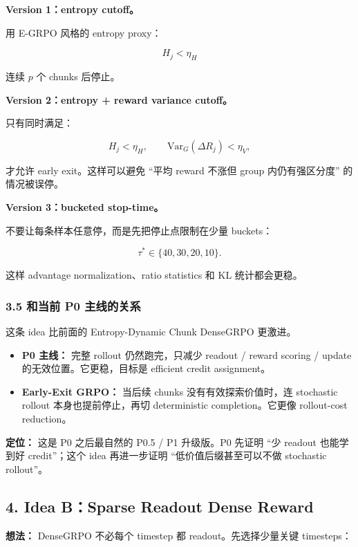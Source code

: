 \textbf{Version 1：entropy cutoff。}

用 E-GRPO 风格的 entropy proxy：

\[
H_j<\eta_H
\]

连续 \(p\) 个 chunks 后停止。

\textbf{Version 2：entropy + reward variance cutoff。}

只有同时满足：

\[
H_j<\eta_H,
\qquad
\mathrm{Var}_{G}(\Delta R_j)<\eta_V,
\]

才允许 early exit。这样可以避免 ``平均 reward 不涨但 group 内仍有强区分度'' 的情况被误停。

\textbf{Version 3：bucketed stop-time。}

不要让每条样本任意停，而是先把停止点限制在少量 buckets：

\[
\tau^*\in\{40,30,20,10\}.
\]

这样 advantage normalization、ratio statistics 和 KL 统计都会更稳。

\subsubsection{3.5 和当前 P0 主线的关系}

这条 idea 比前面的 Entropy-Dynamic Chunk DenseGRPO 更激进。

\begin{itemize}[leftmargin=1.5em]
  \item \textbf{P0 主线：} 完整 rollout 仍然跑完，只减少 readout / reward scoring / update 的无效位置。它更稳，目标是 efficient credit assignment。
  \item \textbf{Early-Exit GRPO：} 当后续 chunks 没有有效探索价值时，连 stochastic rollout 本身也提前停止，再切 deterministic completion。它更像 rollout-cost reduction。
\end{itemize}

\begin{summarybox}
\textbf{定位：} 这是 P0 之后最自然的 P0.5 / P1 升级版。P0 先证明 ``少 readout 也能学到好 credit''；这个 idea 再进一步证明 ``低价值后缀甚至可以不做 stochastic rollout''。
\end{summarybox}

\subsection{4. Idea B：Sparse Readout Dense Reward}

\textbf{想法：} DenseGRPO 不必每个 timestep 都 readout。先选择少量关键 timesteps：

